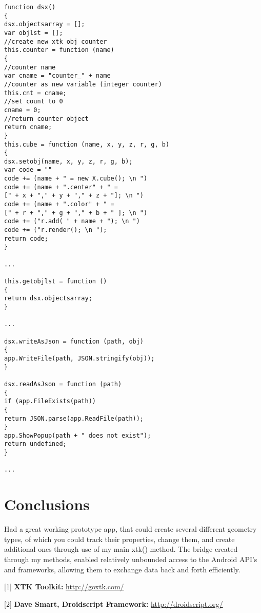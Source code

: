 \documentclass[sigconf]{acmart}
\begin{document}
\begin{verbatim}
function dsx()
{
dsx.objectsarray = [];
var objlst = [];
//create new xtk obj counter
this.counter = function (name)
{
//counter name
var cname = "counter_" + name
//counter as new variable (integer counter)
this.cnt = cname;
//set count to 0
cname = 0;
//return counter object
return cname;
}
this.cube = function (name, x, y, z, r, g, b)
{
dsx.setobj(name, x, y, z, r, g, b);
var code = ""
code += (name + " = new X.cube(); \n ")
code += (name + ".center" + " = 
[" + x + "," + y + "," + z + "]; \n ")
code += (name + ".color" + " = 
[" + r + "," + g + "," + b + " ]; \n ")
code += ("r.add( " + name + "); \n ")
code += ("r.render(); \n ");
return code;
}

...

this.getobjlst = function ()
{
return dsx.objectsarray;
}

...

dsx.writeAsJson = function (path, obj)
{
app.WriteFile(path, JSON.stringify(obj));
}

dsx.readAsJson = function (path)
{
if (app.FileExists(path))
{
return JSON.parse(app.ReadFile(path));
}
app.ShowPopup(path + " does not exist");
return undefined;
}

...
\end{verbatim}

\section{Conclusions}
Had a great working prototype app, that could create several different geometry types, of which you could track their properties, change them, and create additional ones through use of my main xtk() method. The bridge created through my methods, enabled relatively unbounded access to the Android API's and frameworks, allowing them to exchange data back and forth efficiently.


\biblioht


[1] \textbf{XTK Toolkit:   }   \hyperlink{http://goxtk.com}{http://goxtk.com/}

[2] \textbf{Dave Smart, Droidscript Framework:    }   \hyperlink{http://droidscript.org/}{http://droidscript.org/}
\end{document}
